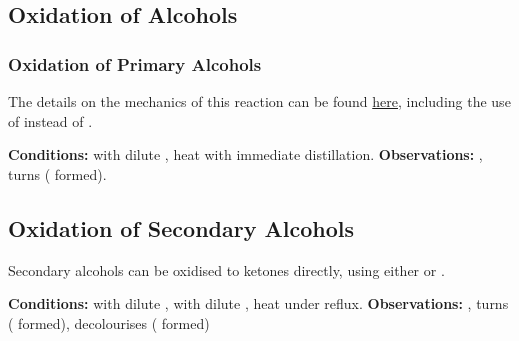 		\subsection{Oxidation of Alcohols}

			\subsubsection{Oxidation of Primary Alcohols}

				The details on the mechanics of this reaction can be found \hyperlink{OxidationOfPrimaryAlcohols}{here}, including
				the use of  instead of .

				\vspace{1.5em}
				\vbox{\textbf{Conditions:}	\tabto{35mm} with dilute ,
											\tabto{35mm}heat with immediate distillation.}
				\vspace{0.75em}
				\vbox{\textbf{Observations:}\tabto{35mm} , turns 
														( formed).}



			\subsection{Oxidation of Secondary Alcohols}

				Secondary alcohols can be oxidised to ketones directly, using either  or .

				\vspace{1.5em}
				\vbox{\textbf{Conditions:}	\tabto{35mm} with dilute ,   with dilute ,
											\tabto{35mm}heat under reflux.}
				\vspace{0.75em}
				\vbox{\textbf{Observations:}\tabto{35mm} , turns 
														( formed), 
											\tabto{35mm}  decolourises ( formed)}



